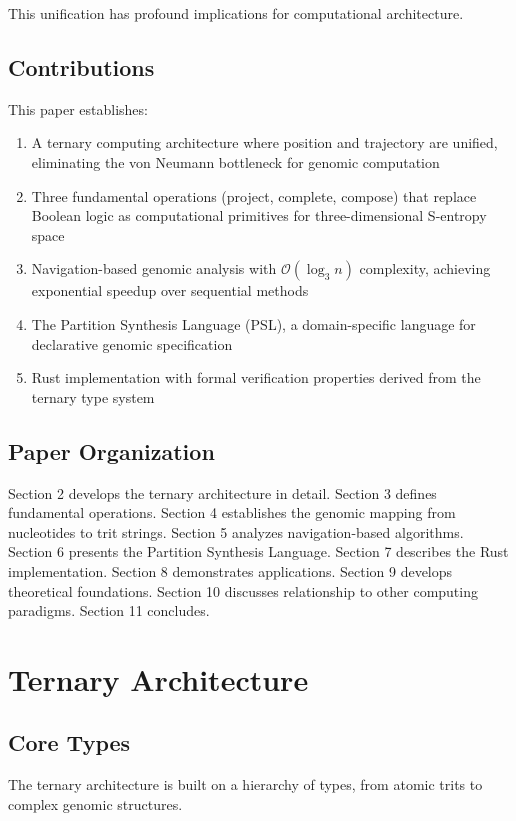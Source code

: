 \documentclass[twocolumn,10pt]{article}
\theoremstyle{remark}
\newcommand{\bigO}{\mathcal{O}}
\begin{document}
This unification has profound implications for computational architecture.

\subsection{Contributions}

This paper establishes:
\begin{enumerate}
\item A ternary computing architecture where position and trajectory are unified, eliminating the von Neumann bottleneck for genomic computation
\item Three fundamental operations (project, complete, compose) that replace Boolean logic as computational primitives for three-dimensional S-entropy space
\item Navigation-based genomic analysis with $\bigO(\log_3 n)$ complexity, achieving exponential speedup over sequential methods
\item The Partition Synthesis Language (PSL), a domain-specific language for declarative genomic specification
\item Rust implementation with formal verification properties derived from the ternary type system
\end{enumerate}

\subsection{Paper Organization}

Section 2 develops the ternary architecture in detail. Section 3 defines fundamental operations. Section 4 establishes the genomic mapping from nucleotides to trit strings. Section 5 analyzes navigation-based algorithms. Section 6 presents the Partition Synthesis Language. Section 7 describes the Rust implementation. Section 8 demonstrates applications. Section 9 develops theoretical foundations. Section 10 discusses relationship to other computing paradigms. Section 11 concludes.

\section{Ternary Architecture}

\subsection{Core Types}

The ternary architecture is built on a hierarchy of types, from atomic trits to complex genomic structures.
\end{document}
